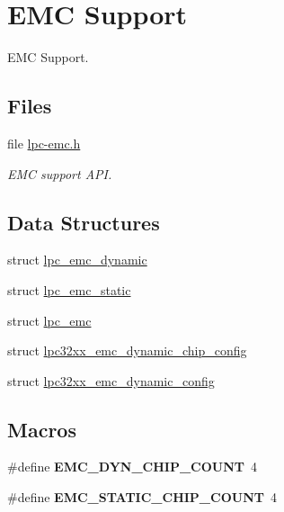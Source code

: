 \hypertarget{group__lpc__emc}{}\section{E\+MC Support}
\label{group__lpc__emc}


E\+MC Support.  


\subsection*{Files}
\begin{DoxyCompactItemize}
\item 
file \mbox{\hyperlink{lpc-emc_8h}{lpc-\/emc.\+h}}
\begin{DoxyCompactList}\small\item\em E\+MC support A\+PI. \end{DoxyCompactList}\end{DoxyCompactItemize}
\subsection*{Data Structures}
\begin{DoxyCompactItemize}
\item 
struct \mbox{\hyperlink{structlpc__emc__dynamic}{lpc\+\_\+emc\+\_\+dynamic}}
\item 
struct \mbox{\hyperlink{structlpc__emc__static}{lpc\+\_\+emc\+\_\+static}}
\item 
struct \mbox{\hyperlink{structlpc__emc}{lpc\+\_\+emc}}
\item 
struct \mbox{\hyperlink{structlpc32xx__emc__dynamic__chip__config}{lpc32xx\+\_\+emc\+\_\+dynamic\+\_\+chip\+\_\+config}}
\item 
struct \mbox{\hyperlink{structlpc32xx__emc__dynamic__config}{lpc32xx\+\_\+emc\+\_\+dynamic\+\_\+config}}
\end{DoxyCompactItemize}
\subsection*{Macros}
\begin{DoxyCompactItemize}
\item 
\mbox{\label{group__lpc__emc_gad5c88831d1410da50802228017bb8848}} 
\#define {\bfseries E\+M\+C\+\_\+\+D\+Y\+N\+\_\+\+C\+H\+I\+P\+\_\+\+C\+O\+U\+NT}~4
\item 
\mbox{\label{group__lpc__emc_ga11cceae0418a8b3e2fa120bec3da80f3}} 
\#define {\bfseries E\+M\+C\+\_\+\+S\+T\+A\+T\+I\+C\+\_\+\+C\+H\+I\+P\+\_\+\+C\+O\+U\+NT}~4
\end{DoxyCompactItemize}
